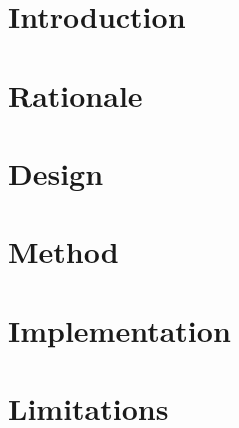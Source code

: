 \section{Introduction}
\label{sec:rebuilding:introduction}



\section{Rationale}
\label{sec:rebuilding:rationale}



\section{Design}
\label{sec:rebuilding:design}



\section{Method}
\label{sec:rebuilding:method}



\section{Implementation}


\section{Limitations}




